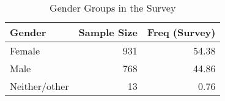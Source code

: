 \begin{table}[th!]
\centering
\caption{Gender Groups in the Survey}
\label{tab-01-gender.tex}
\begin{tabular}{lrr}
\toprule
       Gender &  Sample Size &  Freq (Survey) \\
\midrule
       Female &          931 &          54.38 \\
         Male &          768 &          44.86 \\
Neither/other &           13 &           0.76 \\
\bottomrule
\end{tabular}
\end{table}
